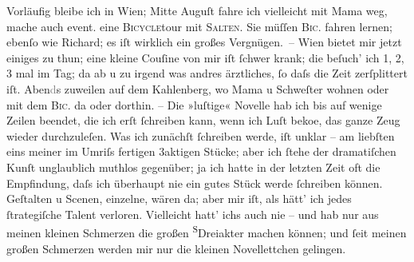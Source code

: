 \begin{ledgroupsized}[t]{13cm}
           Vorläufig bleibe ich in Wien; Mitte
                  Auguſt fahre ich vielleicht mit Mama weg, {\pb}mache auch event. eine
                  \textsc{Bicycle}tour mit \textsc{Salten}. Sie müſſen \textsc{Bic.} fahren lernen; ebenſo wie Richard; es iſt wirklich ein großes
               Vergnügen. –\pend
           \pstart
           Wien bietet mir jetzt einiges zu thun; eine kleine
                  Couſine von mir iſt
               ſchwer krank; die beſuch’ ich 1, 2, 3 mal im Tag; da{\geminationn} ab
               u zu irgend was andres ärztliches, ſo daſs die Zeit zerſplittert iſt.
                  Aben\textcolor{gray}{d}s zuweilen auf dem Kahlenberg, wo Mama u Schweſter
               wohnen oder mit dem \textsc{Bic.} da oder dorthin.\pend
           \pstart
           {\pb}– Die »luſtige« Novelle hab ich bis auf wenige Zeilen beendet, die ich erſt
               ſchreiben kann, wenn ich Luſt beko{\geminationm}e, das ganze Zeug
               wieder durchzuleſen. Was ich zunächſt ſchreiben werde, iſt unklar – am liebſten eins
               meiner im Umriſs fertigen 3aktigen Stücke; aber ich ſtehe der dramatiſchen Kunſt
               unglaublich muthlos gegenüber; ja ich hatte in der letzten Zeit oft die Empfindung,
               daſs ich überhaupt nie {\pb}ein gutes Stück werde ſchreiben
               können. Geſtalten u Scenen, einzelne, wären da; aber mir iſt, als hätt’ ich jedes
               ſtrategiſche Talent verloren. Vielleicht hatt’ ichs auch nie – und hab nur aus meinen
               kleinen Schmerzen die großen \substVorne{}\textsuperscript{S}\substDazwischen{}D\substHinten{}reiakter machen können; und ſeit meinen großen Schmerzen  werden mir nur die kleinen Novellettchen gelingen.

\end{ledgroupsized}
